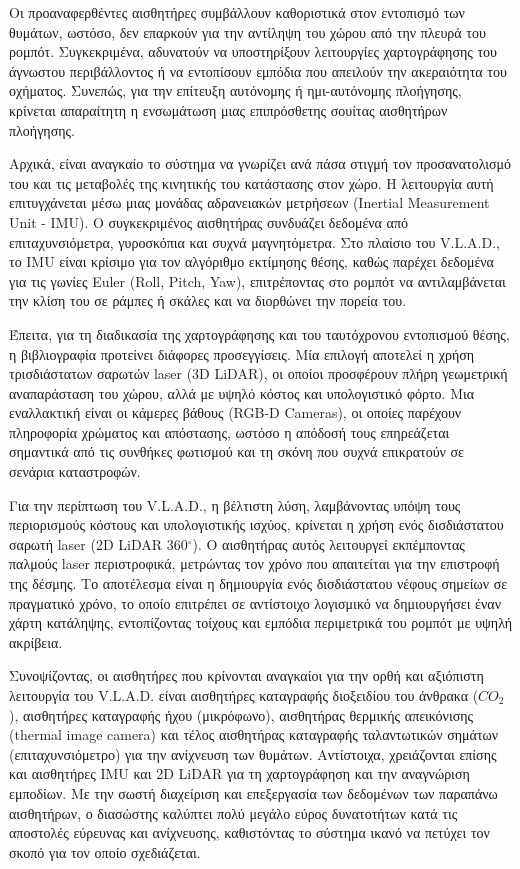 \par Οι προαναφερθέντες αισθητήρες συμβάλλουν καθοριστικά στον εντοπισμό των θυμάτων, ωστόσο, δεν επαρκούν για την αντίληψη του χώρου από την πλευρά του ρομπότ. Συγκεκριμένα, αδυνατούν να υποστηρίξουν λειτουργίες χαρτογράφησης του άγνωστου περιβάλλοντος ή να εντοπίσουν εμπόδια που απειλούν την ακεραιότητα του οχήματος. Συνεπώς, για την επίτευξη αυτόνομης ή ημι-αυτόνομης πλοήγησης, κρίνεται απαραίτητη η ενσωμάτωση μιας επιπρόσθετης σουίτας αισθητήρων πλοήγησης.
\par Αρχικά, είναι αναγκαίο το σύστημα να γνωρίζει ανά πάσα στιγμή τον προσανατολισμό του και τις μεταβολές της κινητικής του κατάστασης στον χώρο. Η λειτουργία αυτή επιτυγχάνεται μέσω μιας μονάδας αδρανειακών μετρήσεων (Inertial Measurement Unit - IMU). Ο συγκεκριμένος αισθητήρας συνδυάζει δεδομένα από επιταχυνσιόμετρα, γυροσκόπια και συχνά μαγνητόμετρα. Στο πλαίσιο του V.L.A.D., το IMU είναι κρίσιμο για τον αλγόριθμο εκτίμησης θέσης, καθώς παρέχει δεδομένα για τις γωνίες Euler (Roll, Pitch, Yaw), επιτρέποντας στο ρομπότ να αντιλαμβάνεται την κλίση του σε ράμπες ή σκάλες και να διορθώνει την πορεία του.
\par Έπειτα, για τη διαδικασία της χαρτογράφησης και του ταυτόχρονου εντοπισμού θέσης, η βιβλιογραφία προτείνει διάφορες προσεγγίσεις. Μία επιλογή αποτελεί η χρήση τρισδιάστατων σαρωτών laser (3D LiDAR), οι οποίοι προσφέρουν πλήρη γεωμετρική αναπαράσταση του χώρου, αλλά με υψηλό κόστος και υπολογιστικό φόρτο. Μια εναλλακτική είναι οι κάμερες βάθους (RGB-D Cameras), οι οποίες παρέχουν πληροφορία χρώματος και απόστασης, ωστόσο η απόδοσή τους επηρεάζεται σημαντικά από τις συνθήκες φωτισμού και τη σκόνη που συχνά επικρατούν σε σενάρια καταστροφών.
\par Για την περίπτωση του V.L.A.D., η βέλτιστη λύση, λαμβάνοντας υπόψη τους περιορισμούς κόστους και υπολογιστικής ισχύος, κρίνεται η χρήση ενός δισδιάστατου σαρωτή laser (2D LiDAR 360$^\circ$). Ο αισθητήρας αυτός λειτουργεί εκπέμποντας παλμούς laser περιστροφικά, μετρώντας τον χρόνο που απαιτείται για την επιστροφή της δέσμης. Το αποτέλεσμα είναι η δημιουργία ενός δισδιάστατου νέφους σημείων σε πραγματικό χρόνο, το οποίο επιτρέπει σε αντίστοιχο λογισμικό να δημιουργήσει έναν χάρτη κατάληψης, εντοπίζοντας τοίχους και εμπόδια περιμετρικά του ρομπότ με υψηλή ακρίβεια.
\par Συνοψίζοντας, οι αισθητήρες που κρίνονται αναγκαίοι για την ορθή και αξιόπιστη λειτουργία του V.L.A.D. είναι αισθητήρες καταγραφής διοξειδίου του άνθρακα ($CO_2$), αισθητήρες καταγραφής ήχου (μικρόφωνο), αισθητήρας θερμικής απεικόνισης (thermal image camera) και τέλος αισθητήρας καταγραφής ταλαντωτικών σημάτων (επιταχυνσιόμετρο) για την ανίχνευση των θυμάτων. Αντίστοιχα, χρειάζονται επίσης και αισθητήρες IMU και 2D LiDAR για τη χαρτογράφηση και την αναγνώριση εμποδίων. Με την σωστή διαχείριση και επεξεργασία των δεδομένων των παραπάνω αισθητήρων, ο διασώστης καλύπτει πολύ μεγάλο εύρος δυνατοτήτων κατά τις αποστολές εύρευνας και ανίχνευσης, καθιστόντας το σύστημα ικανό να πετύχει τον σκοπό για τον οποίο σχεδιάζεται.




